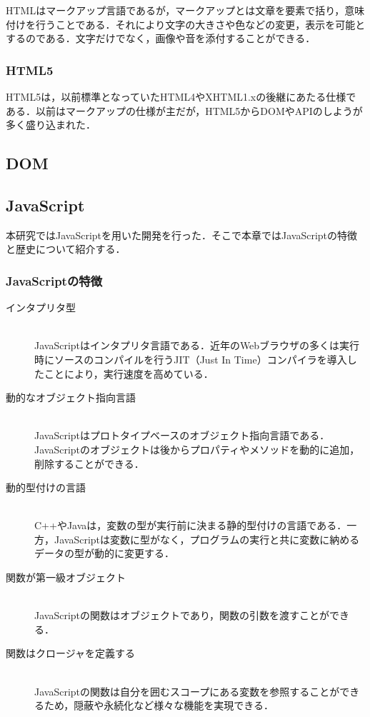 \documentclass[a4j,12pt]{jsarticle}
\begin{document}
HTMLはマークアップ言語であるが，マークアップとは文章を要素で括り，意味付けを行うことである．それにより文字の大きさや色などの変更，表示を可能とするのである．文字だけでなく，画像や音を添付することができる．

\subsubsection{HTML5}
HTML5は，以前標準となっていたHTML4やXHTML1.xの後継にあたる仕様である．以前はマークアップの仕様が主だが，HTML5からDOMやAPIのしようが多く盛り込まれた．

\subsection{DOM}
\subsection{JavaScript}
本研究ではJavaScriptを用いた開発を行った．そこで本章ではJavaScriptの特徴と歴史について紹介する．
\subsubsection{JavaScriptの特徴}
\begin{description}
 \item[インタプリタ型]\mbox{}\\ 
JavaScriptはインタプリタ言語である．近年のWebブラウザの多くは実行時にソースのコンパイルを行うJIT（Just In Time）コンパイラを導入したことにより，実行速度を高めている．
 \item[動的なオブジェクト指向言語]\mbox{}\\
JavaScriptはプロトタイプベースのオブジェクト指向言語である．JavaScriptのオブジェクトは後からプロパティやメソッドを動的に追加，削除することができる．
 \item[動的型付けの言語]\mbox{}\\
C++やJavaは，変数の型が実行前に決まる静的型付けの言語である．一方，JavaScriptは変数に型がなく，プログラムの実行と共に変数に納めるデータの型が動的に変更する．	   
\item[関数が第一級オブジェクト]\mbox{}\\
JavaScriptの関数はオブジェクトであり，関数の引数を渡すことができる．	   
\item[関数はクロージャを定義する]\mbox{}\\
JavaScriptの関数は自分を囲むスコープにある変数を参照することができるため，隠蔽や永続化など様々な機能を実現できる．
\end{description}
\end{document}
